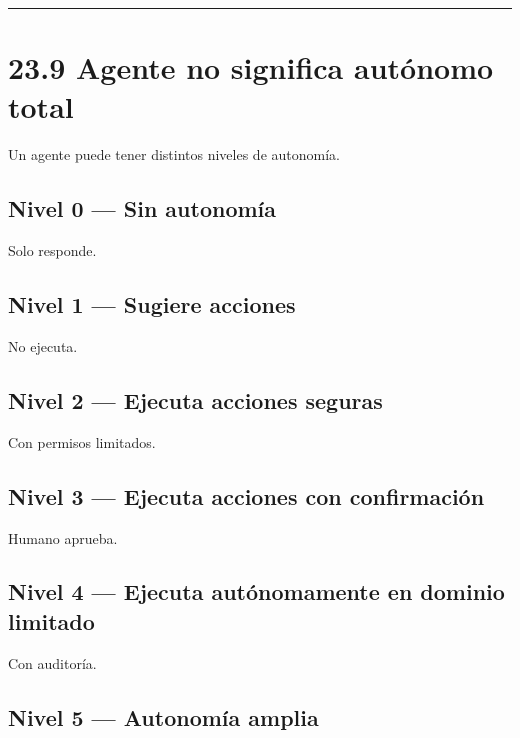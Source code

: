 \begin{center}\rule{0.5\linewidth}{0.5pt}\end{center}

\section{23.9 Agente no significa autónomo
total}\label{agente-no-significa-autuxf3nomo-total}

Un agente puede tener distintos niveles de autonomía.

\subsection{Nivel 0 --- Sin autonomía}\label{nivel-0-sin-autonomuxeda}

Solo responde.

\subsection{Nivel 1 --- Sugiere
acciones}\label{nivel-1-sugiere-acciones}

No ejecuta.

\subsection{Nivel 2 --- Ejecuta acciones
seguras}\label{nivel-2-ejecuta-acciones-seguras}

Con permisos limitados.

\subsection{Nivel 3 --- Ejecuta acciones con
confirmación}\label{nivel-3-ejecuta-acciones-con-confirmaciuxf3n}

Humano aprueba.

\subsection{Nivel 4 --- Ejecuta autónomamente en dominio
limitado}\label{nivel-4-ejecuta-autuxf3nomamente-en-dominio-limitado}

Con auditoría.

\subsection{Nivel 5 --- Autonomía
amplia}\label{nivel-5-autonomuxeda-amplia}

